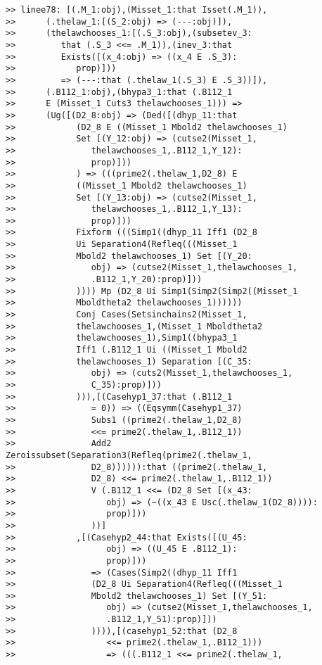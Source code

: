 \documentclass[12pt]{article}
\begin{document}
\begin{verbatim}
>> linee78: [(.M_1:obj),(Misset_1:that Isset(.M_1)),
>>      (.thelaw_1:[(S_2:obj) => (---:obj)]),
>>      (thelawchooses_1:[(.S_3:obj),(subsetev_3:
>>         that (.S_3 <<= .M_1)),(inev_3:that
>>         Exists([(x_4:obj) => ((x_4 E .S_3):
>>            prop)]))
>>         => (---:that (.thelaw_1(.S_3) E .S_3))]),
>>      (.B112_1:obj),(bhypa3_1:that (.B112_1
>>      E (Misset_1 Cuts3 thelawchooses_1))) =>
>>      (Ug([(D2_8:obj) => (Ded([(dhyp_11:that
>>            (D2_8 E ((Misset_1 Mbold2 thelawchooses_1)
>>            Set [(Y_12:obj) => (cutse2(Misset_1,
>>               thelawchooses_1,.B112_1,Y_12):
>>               prop)]))
>>            ) => (((prime2(.thelaw_1,D2_8) E
>>            ((Misset_1 Mbold2 thelawchooses_1)
>>            Set [(Y_13:obj) => (cutse2(Misset_1,
>>               thelawchooses_1,.B112_1,Y_13):
>>               prop)]))
>>            Fixform (((Simp1((dhyp_11 Iff1 (D2_8
>>            Ui Separation4(Refleq(((Misset_1
>>            Mbold2 thelawchooses_1) Set [(Y_20:
>>               obj) => (cutse2(Misset_1,thelawchooses_1,
>>               .B112_1,Y_20):prop)]))
>>            )))) Mp (D2_8 Ui Simp1(Simp2(Simp2((Misset_1
>>            Mboldtheta2 thelawchooses_1))))))
>>            Conj Cases(Setsinchains2(Misset_1,
>>            thelawchooses_1,(Misset_1 Mboldtheta2
>>            thelawchooses_1),Simp1((bhypa3_1
>>            Iff1 (.B112_1 Ui ((Misset_1 Mbold2
>>            thelawchooses_1) Separation [(C_35:
>>               obj) => (cuts2(Misset_1,thelawchooses_1,
>>               C_35):prop)]))
>>            ))),[(Casehyp1_37:that (.B112_1
>>               = 0)) => ((Eqsymm(Casehyp1_37)
>>               Subs1 ((prime2(.thelaw_1,D2_8)
>>               <<= prime2(.thelaw_1,.B112_1))
>>               Add2 Zeroissubset(Separation3(Refleq(prime2(.thelaw_1,
>>               D2_8)))))):that ((prime2(.thelaw_1,
>>               D2_8) <<= prime2(.thelaw_1,.B112_1))
>>               V (.B112_1 <<= (D2_8 Set [(x_43:
>>                  obj) => (~((x_43 E Usc(.thelaw_1(D2_8)))):
>>                  prop)]))
>>               ))]
>>            ,[(Casehyp2_44:that Exists([(U_45:
>>                  obj) => ((U_45 E .B112_1):
>>                  prop)]))
>>               => (Cases(Simp2((dhyp_11 Iff1
>>               (D2_8 Ui Separation4(Refleq(((Misset_1
>>               Mbold2 thelawchooses_1) Set [(Y_51:
>>                  obj) => (cutse2(Misset_1,thelawchooses_1,
>>                  .B112_1,Y_51):prop)]))
>>               )))),[(casehyp1_52:that (D2_8
>>                  <<= prime2(.thelaw_1,.B112_1)))
>>                  => (((.B112_1 <<= prime2(.thelaw_1,

\end{verbatim}
\end{document}
